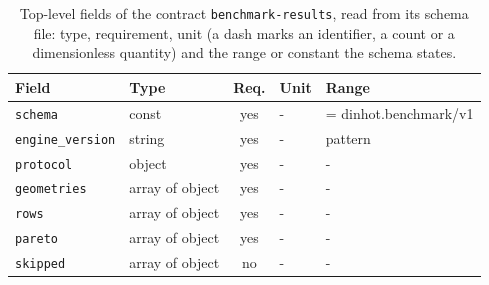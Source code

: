 \begin{table}[t]\centering\footnotesize
\caption{Top-level fields of the contract \texttt{benchmark-results}, read from its schema file: type, requirement, unit (a dash marks an identifier, a count or a dimensionless quantity) and the range or constant the schema states.}\label{tab:contract-benchmark-results}
\begin{tabular}{@{}l l c l >{\raggedright\arraybackslash}p{}@{}}\toprule Field & Type & Req. & Unit & Range\\\midrule
\texttt{\scriptsize schema} & const & yes & - & = dinhot.benchmark/v1\\
\texttt{\scriptsize engine\_version} & string & yes & - & pattern\\
\texttt{\scriptsize protocol} & object & yes & - & -\\
\texttt{\scriptsize geometries} & array of object & yes & - & -\\
\texttt{\scriptsize rows} & array of object & yes & - & -\\
\texttt{\scriptsize pareto} & array of object & yes & - & -\\
\texttt{\scriptsize skipped} & array of object & no & - & -\\
\bottomrule\end{tabular}\end{table}
